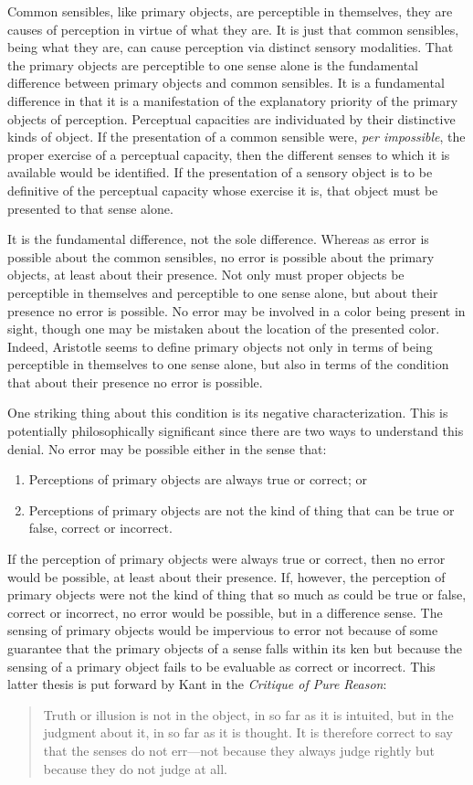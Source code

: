 Common sensibles, like primary objects, are perceptible in themselves, they are causes of perception in virtue of what they are. It is just that common sensibles, being what they are, can cause perception via distinct sensory modalities. That the primary objects are perceptible to one sense alone is the fundamental difference between primary objects and common sensibles. It is a fundamental difference in that it is a manifestation of the explanatory priority of the primary objects of perception. Perceptual capacities are individuated by their distinctive kinds of object. If the presentation of a common sensible were, \emph{per impossible}, the proper exercise of a perceptual capacity, then the different senses to which it is available would be identified. If the presentation of a sensory object is to be definitive of the perceptual capacity whose exercise it is, that object must be presented to that sense alone.

It is the fundamental difference, not the sole difference. Whereas as error is possible about the common sensibles, no error is possible about the primary objects, at least about their presence. Not only must proper objects be perceptible in themselves and perceptible to one sense alone, but about their presence no error is possible. No error may be involved in a color being present in sight, though one may be mistaken about the location of the presented color. Indeed, Aristotle seems to define primary objects not only in terms of being perceptible in themselves to one sense alone, but also in terms of the condition that about their presence no error is possible.

One striking thing about this condition is its negative characterization. This is potentially philosophically significant since there are two ways to understand this denial. No error may be possible either in the sense that:
\begin{enumerate}[(1)]
	\item Perceptions of primary objects are always true or correct; or
	\item Perceptions of primary objects are not the kind of thing that can be true or false, correct or incorrect.
\end{enumerate}
If the perception of primary objects were always true or correct, then no error would be possible, at least about their presence. If, however, the perception of primary objects were not the kind of thing that so much as could be true or false, correct or incorrect, no error would be possible, but in a difference sense. The sensing of primary objects would be impervious to error not because of some guarantee that the primary objects of a sense falls within its ken but because the sensing of a primary object fails to be evaluable as correct or incorrect. This latter thesis is put forward by Kant in the \emph{Critique of Pure Reason}:
\begin{quote}
	Truth or illusion is not in the object, in so far as it is intuited, but in the judgment about it, in so far as it is thought. It is therefore correct to say that the senses do not err---not because they always judge rightly but because they do not judge at all. \citep[\textsc{a}294/\textsc{b}350]{Kant:1781fk}
\end{quote}

